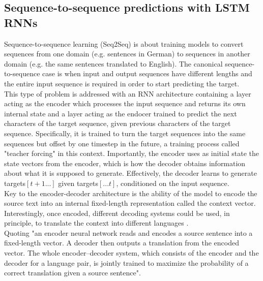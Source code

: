 ﻿\documentclass[conference]{IEEEtran}
\begin{document}
\subsection{Sequence-to-sequence predictions with LSTM RNNs}
Sequence-to-sequence learning (Seq2Seq) is about training models to convert sequences from one domain (e.g. sentences in German) to sequences in another domain (e.g. the same sentences translated to English). The canonical sequence-to-sequence case is when input and output sequences have different lengths and the entire input sequence is required in order to start predicting the target. \\
This type of problem is addressed with an RNN architecture containing a layer acting as the encoder which processes the input sequence and returns its own internal state and a layer acting as the endocer trained to predict the next characters of the target sequence, given previous characters of the target sequence. Specifically, it is trained to turn the target sequences into the same sequences but offset by one timestep in the future, a training process called "teacher forcing" in this context. Importantly, the encoder uses as initial state the state vectors from the encoder, which is how the decoder obtains information about what it is supposed to generate. Effectively, the decoder learns to generate targets$[t+1...]$ given targets$[...t]$, conditioned on the input sequence. \\
Key to the encoder-decoder architecture is the ability of the model to encode the source text into an internal fixed-length representation called the context vector. Interestingly, once encoded, different decoding systems could be used, in principle, to translate the context into different languages \cite{gentle}.\\
Quoting \cite{2014} "an encoder neural network reads and encodes a source sentence into a fixed-length vector. A decoder then outputs a translation from the encoded vector. The whole encoder–decoder system, which consists of the encoder and the decoder for a language pair, is jointly trained to maximize the probability of a correct translation given a source sentence".\\
\end{document}
